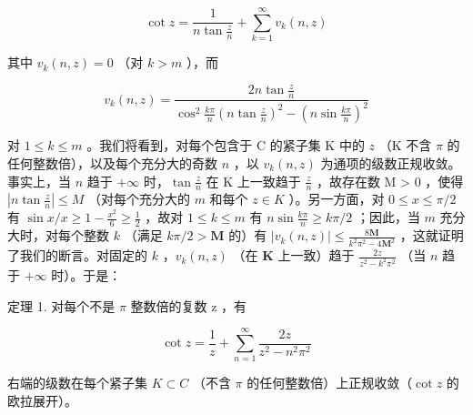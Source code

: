 \[
\cot z = \frac {1}{n \tan \frac {z}{n}} + \sum_ {k = 1} ^ {\infty} v _ {k} (n, z)
\]

其中 \(v_{k}(n,z) = 0\) （对 \(k > m\) ），而

\[
v _ {k} (n, z) = \frac {2 n \tan \frac {z}{n}}{\cos^ {2} \frac {k \pi}{n} \left(n \tan \frac {z}{n}\right) ^ {2} - \left(n \sin \frac {k \pi}{n}\right) ^ {2}}
\]

对 \(1 \leqslant k \leqslant m\) 。我们将看到，对每个包含于 C 的紧子集 K 中的 \(z\) （K 不含 \(\pi\) 的任何整数倍），以及每个充分大的奇数 \(n\) ，以 \(v_{k}(n,z)\) 为通项的级数正规收敛。事实上，当 \(n\) 趋于 \(+\infty\) 时，\(\tan \frac{z}{n}\) 在 K 上一致趋于 \(\frac{z}{n}\) ，故存在数 M \textgreater{} 0 ，使得 \(\left| n \tan \frac{z}{n} \right| \leqslant M\) （对每个充分大的 \(m\) 和每个 \(z \in K\) ）。另一方面，对 \(0 \leqslant x \leqslant \pi/2\) 有 \(\sin x/x \geqslant 1 - \frac{x^2}{6} \geqslant \frac{1}{2}\) ，故对 \(1 \leqslant k \leqslant m\) 有 \(n \sin \frac{k\pi}{n} \geqslant k\pi/2\) ；因此，当 \(m\) 充分大时，对每个整数 \(k\) （满足 \(k\pi / 2 > \mathbf{M}\) 的）有 \(|v_k(n, z)| \leqslant \frac{8\mathbf{M}}{k^2\pi^2 - 4\mathbf{M}^2}\) ，这就证明了我们的断言。对固定的 \(k\) ，\(v_k(n, z)\) （在 \(\mathbf{K}\) 上一致）趋于 \(\frac{2z}{z^2 - k^2\pi^2}\) （当 \(n\) 趋于 \(+\infty\) 时）。于是：

定理 1. 对每个不是 \(\pi\) 整数倍的复数 z ，有

\[
\cot z = \frac {1}{z} + \sum_ {n = 1} ^ {\infty} \frac {2 z}{z ^ {2} - n ^ {2} \pi^ {2}}\tag{8}
\]

右端的级数在每个紧子集 \(K \subset C\) （不含 \(\pi\) 的任何整数倍）上正规收敛（\(\cot z\) 的欧拉展开）。

